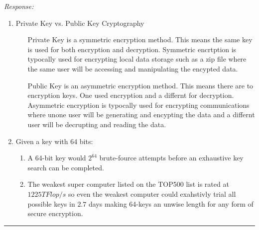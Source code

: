 \documentclass[a4paper, 11pt]{article}
\newenvironment{response}
                {\textit{Response:}}
                {}
\begin{document}
 \begin{response}
   \begin{enumerate}[label=\arabic*.]
   \item
     Private Key vs. Public Key Cryptography
     \begin{itemize}
     \item[Private Key]
       is a symmetric encryption method. This means the same key is used for both encryption and decryption. Symmetric encrtption is typocally used for encrypting local data storage such as a zip file where the same user will be accessing and manipulating the encypted data.
     \item[Public Key]
       is an asymmetric encryption method. This means there are to encryption keys. One used encryption and a differnt for decryption. Asymmetric encryption is typocally used for encrypting communications where unone user will be generating and encypting the data and a differnt user will be decrupting and reading the data.
     \end{itemize}
     
   \item
     Given a key with 64 bits:
     \begin{enumerate}[label=\alph*.]
     \item
       A 64-bit key would $2^{64}$ brute-fource attempts before an exhaustive key search can be completed.
     \item
       The weakest super computer listed on the TOP500 list is rated at $1225 TFlop/s$ so even the weakest computer could exahstivly trial all possible keys in $2.7$ days making 64-keys an unwise length for any form of secure encryption.
     \end{enumerate}             
   \end{enumerate}      
 \end{response}
 \noindent\rule{7in}{2.8pt}
\end{document}
